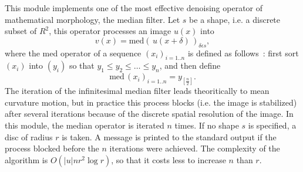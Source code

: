 This module implements one of the most effective denoising operator of 
mathematical morphology, the median filter. 
Let $s$ be a shape, i.e. a 
discrete subset of $R^2$, this operator processes an image $u(x)$ into
$$v(x)=\mathrm{med}\left(\,u(x+\delta)\,\right)_{\delta \epsilon s},$$
where the med operator of a sequence $(x_i)_{i=1..n}$ is defined as follows~: 
first sort $(x_i)$ into $(y_i)$ so that $y_1\leq y_2 \leq\ldots\leq y_n$, and 
then define
$$\mathrm{med}\,(x_i)_{i=1..n} = y_{[\frac{n}{2}]}.$$
The iteration of the infinitesimal median filter leads theoritically to mean 
curvature motion, but in practice this process blocks (i.e. the image is
stabilized) after several 
iterations because of the discrete spatial resolution of the image. 
In this module, the 
median operator is iterated $n$ times. If no shape $s$ is specified, a disc
of radius $r$ is taken. A message is printed to the standard output
if the process blocked before the $n$ iterations were achieved.
The complexity of the algorithm is $O(|u| n r^2 \log r)$, so that it costs
less to increase $n$ than $r$. 
